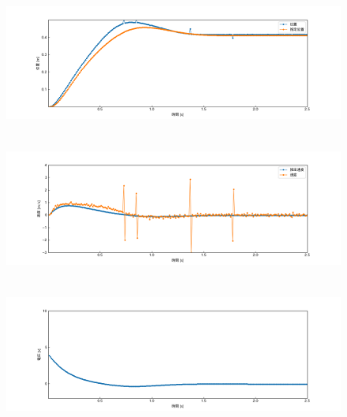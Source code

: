 \documentclass[12pt]{jsarticle}
\begin{document}
\begin{figure}[H]
  \begin{center}
    \includegraphics[clip,width=13.0cm, height=4.4cm]{../img/Exp10-1.png}
    \caption{}
    \label{Exp10-1}
  \end{center}
\end{figure}
\begin{figure}[H]
  \begin{center}
    \includegraphics[clip,width=13.0cm, height=4.4cm]{../img/Exp10-2.png}
    \caption{}
    \label{Exp10-2}
  \end{center}
\end{figure}
\begin{figure}[H]
  \begin{center}
    \includegraphics[clip,width=13.0cm, height=4.4cm]{../img/Exp10-3.png}
    \caption{}
    \label{Exp10-3}
  \end{center}
\end{figure}
\end{document}
